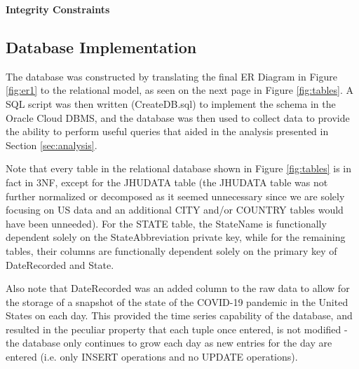 \documentclass[11pt]{article}
\begin{document}
\noindent
\textbf{Integrity Constraints}

\pagebreak

\subsection{Database Implementation}
\label{subsec:implementation}

\noindent
The database was constructed by translating the final ER Diagram in Figure \ref{fig:er1} to the relational model, as seen on the next page in Figure \ref{fig:tables}. A SQL script was then written (CreateDB.sql) to implement the schema in the Oracle Cloud DBMS, and the database was then used to collect data to provide the ability to perform useful queries that aided in the analysis presented in Section \ref{sec:analysis}.

\noindent
Note that every table in the relational database shown in Figure \ref{fig:tables} is in fact in 3NF, except for the JHUDATA table (the JHUDATA table was not further normalized or decomposed as it seemed unnecessary since we are solely focusing on US data and an additional CITY and/or COUNTRY tables would have been unneeded). For the STATE table, the StateName is functionally dependent solely on the StateAbbreviation private key, while for the remaining tables, their columns are functionally dependent solely on the primary key of DateRecorded and State.

\noindent
Also note that DateRecorded was an added column to the raw data to allow for the storage of a snapshot of the state of the COVID-19 pandemic in the United States on each day. This provided the time series capability of the database, and resulted in the peculiar property that each tuple once entered, is not modified - the database only continues to grow each day as new entries for the day are entered (i.e. only INSERT operations and no UPDATE operations).

\pagebreak
\end{document}
